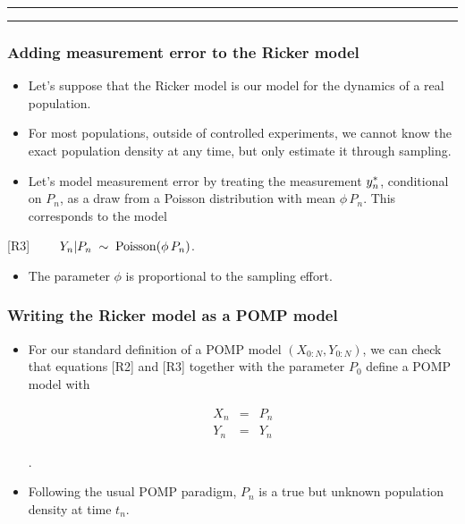 \documentclass[]{article}
\providecommand{\tightlist}{%
  \setlength{\itemsep}{0pt}\setlength{\parskip}{0pt}}
\begin{document}
\begin{center}\rule{0.5\linewidth}{\linethickness}\end{center}

\begin{center}\rule{0.5\linewidth}{\linethickness}\end{center}

\subsubsection{Adding measurement error to the Ricker
model}\label{adding-measurement-error-to-the-ricker-model}

\begin{itemize}
\item
  Let's suppose that the Ricker model is our model for the dynamics of a
  real population.
\item
  For most populations, outside of controlled experiments, we cannot
  know the exact population density at any time, but only estimate it
  through sampling.
\item
  Let's model measurement error by treating the measurement
  \(y_{n}^*\), conditional on \(P_n\), as a draw from a Poisson
  distribution with mean \(\phi\,P_n\). This corresponds to the model
\end{itemize}

{[}R3{]} \(\quad\quad \displaystyle Y_{n}|P_n\;\sim\;\mathrm{Poisson}(\phi\,P_{n})\).

\begin{itemize}
\tightlist
\item
  The parameter \(\phi\) is proportional to the sampling effort.
\end{itemize}

\subsubsection{Writing the Ricker model as a POMP
model}\label{writing-the-ricker-model-as-a-pomp-model}

\begin{itemize}
\item
  For our standard definition of a POMP model \((X_{0:N},Y_{0:N})\), we
  can check that equations {[}R2{]} and {[}R3{]} together with the
  parameter \(P_0\) define a POMP model with

  \begin{eqnarray}
  X_n &=& P_n \\
  Y_n &=& Y_n 
  \end{eqnarray}

  .
\item
  Following the usual POMP paradigm, \(P_n\) is a true but unknown
  population density at time \(t_n\).
\end{itemize}
\end{document}
